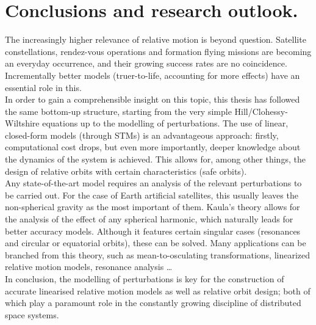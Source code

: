 \chapter{Conclusions and research outlook.}
%
\indent The increasingly higher relevance of relative motion is beyond question. Satellite constellations, rendez-vous operations and formation flying missions are becoming an everyday occurrence, and their growing success rates are no coincidence. Incrementally better models (\ie truer-to-life, accounting for more effects) have an essential role in this. \\
%
\indent In order to gain a comprehensible insight on this topic, this thesis has followed the same bottom-up structure, starting from the very simple Hill/Clohessy-Wiltshire equations up to the modelling of perturbations. The use of linear, closed-form models (through STMs) is an advantageous approach: firstly, computational cost drops, but even more importantly, deeper knowledge about the dynamics of the system is achieved. This allows for, among other things, the design of relative orbits with certain characteristics (\eg safe orbits).\\
%
\indent Any state-of-the-art model requires an analysis of the relevant perturbations to be carried out. For the case of Earth artificial satellites, this usually leaves the non-spherical gravity as the most important of them. Kaula's theory allows for the analysis of the effect of any spherical harmonic, which naturally leads for better accuracy models. Although it features certain singular cases (resonances and circular or equatorial orbits), these can be solved. Many applications can be branched from this theory, such as mean-to-osculating transformations, linearized relative motion models, resonance analysis \ldots \\
%
\indent In conclusion, the modelling of perturbations is key for the construction of accurate linearised relative motion models as well as relative orbit design; both of which play a paramount role in the constantly growing discipline of distributed space systems.
%
